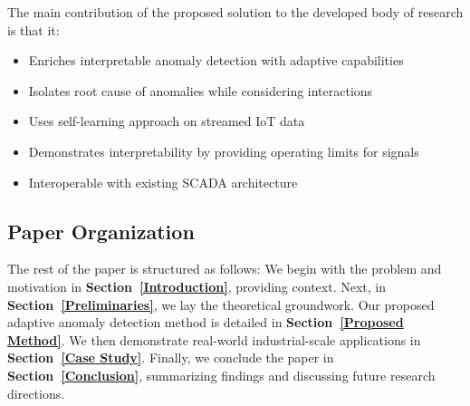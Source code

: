The main contribution of the proposed solution to the developed body of research is that it:
\begin{itemize}
\item Enriches interpretable anomaly detection with adaptive capabilities
\item Isolates root cause of anomalies while considering interactions
\item Uses self-learning approach on streamed IoT data
\item Demonstrates interpretability by providing operating limits for signals
\item Interoperable with existing SCADA architecture
\end{itemize}

\subsection{Paper Organization}
The rest of the paper is structured as follows: We begin with the problem and motivation in \textbf{Section~\ref{Introduction}}, providing context. Next, in \textbf{Section~\ref{Preliminaries}}, we lay the theoretical groundwork. Our proposed adaptive anomaly detection method is detailed in \textbf{Section~\ref{Proposed Method}}. We then demonstrate real-world industrial-scale applications in \textbf{Section~\ref{Case Study}}. Finally, we conclude the paper in \textbf{Section~\ref{Conclusion}}, summarizing findings and discussing future research directions.
